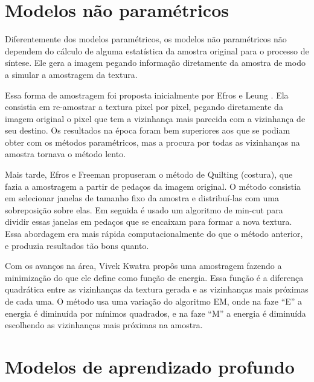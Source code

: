


\section{Modelos não paramétricos}


Diferentemente dos modelos paramétricos,
os modelos não paramétricos não dependem
do cálculo de alguma
estatística da amostra original para
o processo de síntese. Ele gera a imagem
pegando informação diretamente da
amostra de modo a simular a amostragem
da textura.

Essa forma de amostragem foi proposta
inicialmente por Efros e Leung \cite{Efros1999}.
Ela consistia em re-amostrar a textura
pixel por pixel, pegando diretamente
da imagem original o pixel que tem
a vizinhança mais parecida com a vizinhança
de seu destino. Os resultados na época
foram bem superiores aos que se podiam
obter com os métodos paramétricos,
mas a procura por todas as vizinhanças
na amostra tornava o método lento.

Mais tarde, Efros e Freeman \cite{Efros2001}
propuseram o método de Quilting (costura),
que fazia a amostragem a partir
de pedaços da imagem original. 
O método consistia em selecionar
janelas de tamanho fixo da amostra
e distribuí-las com uma sobreposição
sobre elas. Em seguida é usado
um algoritmo de min-cut para dividir
essas janelas em pedaços que se encaixam
para formar a nova textura.
Essa abordagem era mais rápida 
computacionalmente do que o método
anterior, e produzia resultados
tão bons quanto.

Com os avanços na área,
Vivek Kwatra \cite{Kwatra2005} propôs
uma amostragem fazendo a minimização
do que ele define como função de energia. 
Essa função é a diferença quadrática
entre as vizinhanças da textura gerada
e as vizinhanças mais próximas de cada uma.
O método usa uma variação do algoritmo EM, 
onde na faze ``E'' a energia é diminuída
por mínimos quadrados, e na faze ``M'' a
energia é diminuída escolhendo as
vizinhanças mais próximas na amostra.



\section{Modelos de aprendizado profundo}



